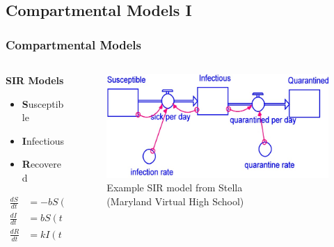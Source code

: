 \documentclass[compress]{beamer}
\begin{document}
\subsection{Compartmental Models I}
    \begin{frame}[Basic2] \frametitle{Compartmental Models}
        \begin{columns}
            \begin{column}{0.4\textwidth}
                \vspace{2mm}

                \textbf{SIR Models}
                \begin{itemize}
                    \item \textbf{S}usceptible
                    \item \textbf{I}nfectious
                    \item \textbf{R}ecovered
                \end{itemize}
                \vspace{-1mm}
                \begin{align*}
                    \frac{dS}{dt} &= -b S(t) I(t)\\
                    \frac{dI}{dt} &= b S(t) I(t) - kI(t)\\
                    \frac{dR}{dt} &= k I(t)
                \end{align*}
            \end{column}

            \begin{column}{0.6\textwidth}
                
                \vspace{2mm}
                
                \begin{figure}
                    \centering
                    \includegraphics[width=0.90\linewidth]{../figures/stella-sir}
                    \caption{Example SIR model from Stella\\(Maryland Virtual High School)}
                    \label{fig:stella-sir}
                \end{figure}

            \end{column}
        \end{columns}
    \end{frame}
\end{document}

